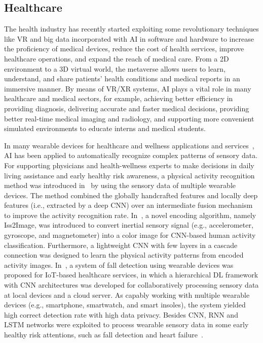 \documentclass[journal]{IEEEtran}
\begin{document}
\subsection{Healthcare}
The health industry has recently started exploiting some revolutionary techniques like VR and big data incorporated with AI in software and hardware to increase the proficiency of medical devices, reduce the cost of health services, improve healthcare operations, and expand the reach of medical care. 
From a 2D environment to a 3D virtual world, the metaverse allows users to learn, understand, and share patients' health conditions and medical reports in an immersive manner. 
By means of VR/XR systems, AI plays a vital role in many healthcare and medical sectors, for example, achieving better efficiency in providing diagnosis, delivering accurate and faster medical decisions, providing better real-time medical imaging and radiology, and supporting more convenient simulated environments to educate interns and medical students.

In many wearable devices for healthcare and wellness applications and services~\cite{banos2015mining}, AI has been applied to automatically recognize complex patterns of sensory data.
For supporting physicians and health-wellness experts to make decisions in daily living assistance and early healthy risk awareness, a physical activity recognition method was introduced in~\cite{huynh2021physical} by using the sensory data of multiple wearable devices. The method combined the globally handcrafted features and locally deep features (i.e., extracted by a deep CNN) over an intermediate fusion mechanism to improve the activity recognition rate. 
In~\cite{hur2018iss2image}, a novel encoding algorithm, namely Iss2Image, was introduced to convert inertial sensory signal (e.g., accelerometer, gyroscope, and magnetometer) into a color image for CNN-based human activity classification. Furthermore, a lightweight CNN with few layers in a cascade connection was designed to learn the physical activity patterns from encoded activity images.
In~\cite{qian2020wearable}, a system of fall detection using wearable devices was proposed for IoT-based healthcare services, in which a hierarchical DL framework with CNN architectures was developed for collaboratively processing sensory data at local devices and a cloud server. As capably working with multiple wearable devices (e.g., smartphone, smartwatch, and smart insoles), the system yielded high correct detection rate with high data privacy.
Besides CNN, RNN and LSTM networks were exploited to process wearable sensory data in some early healthy risk attentions, such as fall detection and heart failure~\cite{li2020bilstm}.
\end{document}

